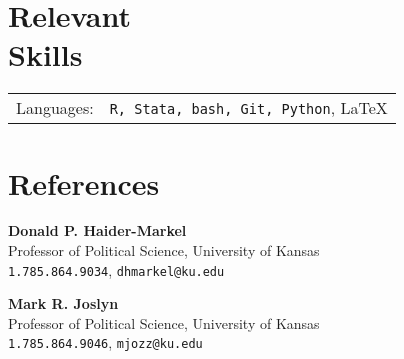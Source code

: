 \documentclass[margin,line,pifont,palatino,courier]{res}
\begin{document}
\begin{resume}

\section{\sc Relevant \\ Skills}

\begin{tabular}{@{}p{0.8in}p{6in}}

Languages:& \verb+R, Stata, bash, Git, Python+, \LaTeX   \\

\end{tabular}






\section{\sc References}

{\bf Donald P. Haider-Markel} \\
Professor of Political Science, University of Kansas \\
\verb+1.785.864.9034+, \texttt{dhmarkel@ku.edu}

{\bf Mark R. Joslyn} \\
Professor of Political Science, University of Kansas \\
\verb+1.785.864.9046+, \texttt{mjozz@ku.edu}

\end{resume}
\end{document}
